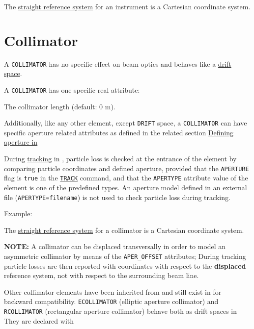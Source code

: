 The \hyperref[subsec:local-straight]{straight reference system} for an 
instrument is a Cartesian coordinate system.  


\section{Collimator}
\label{sec:collimator}

A \texttt{COLLIMATOR} has no specific effect on beam optics and behaves like a
\hyperref[sec:drift]{drift space}. 


A \texttt{COLLIMATOR} has one specific real attribute: 
\begin{madlist}
   The collimator length (default: 0 m). 
\end{madlist}

Additionally, like any other element, except \texttt{DRIFT} space, 
a \texttt{COLLIMATOR} can have specific aperture related attributes 
as defined in the related section \hyperref[sec:def-aper]{Defining 
aperture in \madx}

During \hyperref[chap:thintrack]{tracking} in \madx, particle loss 
is checked at the entrance of the element by comparing particle coordinates 
and defined aperture, provided that the \texttt{APERTURE} flag is \texttt{true} 
in the \hyperref[sec:track]{\texttt{TRACK}} command, 
and that the \texttt{APERTYPE} attribute value of the element is one of the 
predefined types. 
An aperture model defined in an external file (\texttt{APERTYPE=filename})
is not used to check particle loss during tracking. 

Example: 

The \hyperref[subsec:local-straight]{straight reference system} for a
collimator is a Cartesian coordinate system.  

\textbf{NOTE:} A collimator can be displaced transversally in order to
model an asymmetric collimator by means of the \texttt{APER\_OFFSET} attributes; 
During tracking particle losses are then reported with coordinates with respect 
to the \textbf{displaced} reference system, not with respect to the surrounding 
beam line.

Other collimator elements have been inherited from \madeight and still exist 
in \madx for backward compatibility.
\texttt{ECOLLIMATOR} (elliptic aperture collimator) and \texttt{RCOLLIMATOR} 
(rectangular aperture collimator) behave both as drift spaces in \madx 
They are declared with

